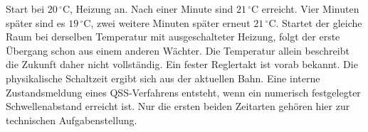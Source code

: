Start bei \(20\,^\circ\mathrm C\), Heizung an. Nach einer Minute sind \(21\,^\circ\mathrm C\) erreicht. Vier Minuten später sind es \(19\,^\circ\mathrm C\), zwei weitere Minuten später erneut \(21\,^\circ\mathrm C\). Startet der gleiche Raum bei derselben Temperatur mit ausgeschalteter Heizung, folgt der erste Übergang schon aus einem anderen Wächter. Die Temperatur allein beschreibt die Zukunft daher nicht vollständig.
Ein fester Reglertakt ist vorab bekannt. Die physikalische Schaltzeit ergibt sich aus der aktuellen Bahn. Eine interne Zustandsmeldung eines QSS-Verfahrens entsteht, wenn ein numerisch festgelegter Schwellenabstand erreicht ist. Nur die ersten beiden Zeitarten gehören hier zur technischen Aufgabenstellung.

